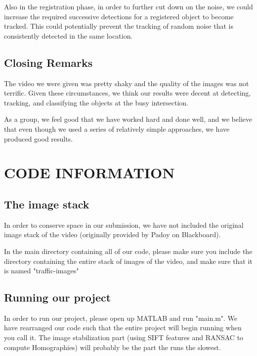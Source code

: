 \documentclass[a4paper, 10pt, conference]{ieeeconf}      %
\begin{document}
Also in the registration phase, in order to further cut down on the noise, we could increase the required successive detections for a registered object to become tracked. This could potentially prevent the tracking of random noise that is consistently detected in the same location. \newline

\subsection{Closing Remarks}
The video we were given was pretty shaky and the quality of the images was not terrific. Given these circumstances, we think our results were decent at detecting, tracking, and classifying the objects at the busy intersection. \newline

As a group, we feel good that we have worked hard and done well, and we believe that even though we used a series of relatively simple approaches, we have produced good results.

\newpage

\section{CODE INFORMATION}

\subsection{The image stack}
In order to conserve space in our submission, we have not included the original image stack of the video (originally provided by Padoy on Blackboard). \newline

In the main directory containing all of our code, please make sure you include the directory containing the entire stack of images of the video, and make sure that it is named "traffic-images" \newline

\subsection{Running our project}
In order to run our project, please open up MATLAB and run "main.m". We have rearranged our code such that the entire project will begin running when you call it. The image stabilization part (using SIFT features and RANSAC to compute Homographies) will probably be the part the runs the slowest. \newline
\end{document}
